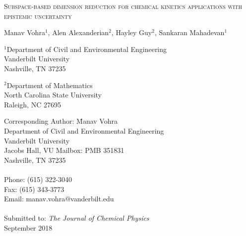 \begin{center}
\textsc{Subspace-based dimension reduction for chemical kinetics applications with epistemic uncertainty}

\bigskip 
\bigskip 

Manav Vohra$^{1}$, Alen Alexanderian$^{2}$, Hayley Guy$^{2}$, Sankaran Mahadevan$^{1}$

\bigskip
\bigskip

\normalsize
$^1$Department of Civil and Environmental Engineering\\
Vanderbilt University\\
Nashville, TN 37235\\

\bigskip

$^2$Department of Mathematics\\
North Carolina State University\\
Raleigh, NC 27695\\

\bigskip

\end{center}

\vspace{6cm}

\begin{tabbing}
Corresponding Author: \hspace{5mm} \= Manav Vohra\\
       \>  Department of Civil and Environmental Engineering\\
       \>  Vanderbilt University\\
        Jacobs Hall, VU Mailbox: PMB 351831 \\
       \>  Nashville, TN 37235 \\
       \> \\
Phone: \> (615) 322-3040 \\
Fax:   \> (615) 343-3773 \\
Email: \>  manav.vohra@vanderbilt.edu   \\
\\
Submitted to: \> \textit{The Journal of Chemical Physics} \\
\>  September 2018\\

\bigskip
\end{tabbing}

\clearpage

